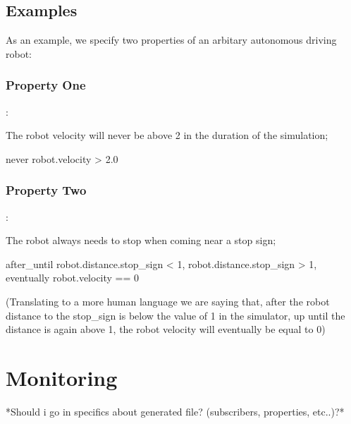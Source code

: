 \documentclass[runningheads]{llncs}
\begin{document}
\subsection{Examples}

As an example, we specify two properties of an arbitary autonomous driving robot:

\subsubsection{Property One}:

The robot velocity will never be above 2 in the duration of the simulation;

never robot.velocity > 2.0

\subsubsection{Property Two}:

The robot always needs to stop when coming near a stop sign;

after\_until robot.distance.stop\_sign < 1, robot.distance.stop\_sign > 1, eventually robot.velocity == 0

(Translating to a more human language we are saying that, after the robot distance to the stop\_sign is below the value of 1 in the simulator, up until the distance is again above 1, the robot velocity will eventually be equal to 0)

\section{Monitoring}
*Should i go in specifics about generated file? (subscribers, properties, etc..)?*


\end{document}
